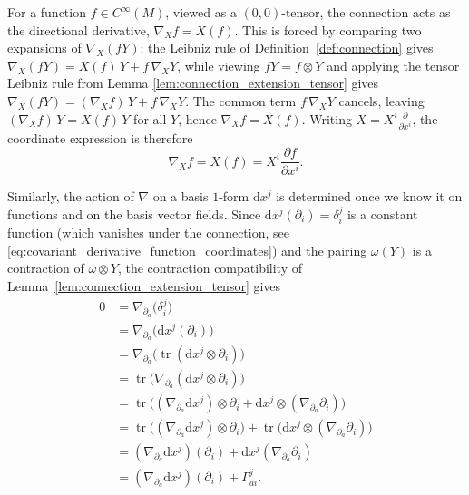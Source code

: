 

For a function $f \in C^\infty(M)$, viewed as a $(0,0)$-tensor, the connection acts as the directional derivative, $\nabla_X f = X(f)$. This is forced by comparing two expansions of $\nabla_X(fY)$: the Leibniz rule of Definition~\ref{def:connection} gives $\nabla_X(fY) = X(f)\,Y + f\,\nabla_X Y$, while viewing $fY = f \otimes Y$ and applying the tensor Leibniz rule from Lemma \ref{lem:connection_extension_tensor} gives $\nabla_X(fY) = (\nabla_X f)\,Y + f\,\nabla_X Y$. The common term $f\,\nabla_X Y$ cancels, leaving $(\nabla_X f)\,Y = X(f)\,Y$ for all $Y$, hence $\nabla_X f = X(f)$. Writing $X = X^i \frac{\partial}{\partial x^i}$, the coordinate expression is therefore
\begin{equation}
    \label{eq:covariant_derivative_function_coordinates}
    \nabla_X f = X(f) = X^i \frac{\partial f}{\partial x^i}.
\end{equation}






Similarly, the action of $\nabla$ on a basis $1$-form $\mathrm{d}x^j$ is determined once we know it on functions and on the basis vector fields. Since $\mathrm{d}x^j(\partial_i) = \delta^j_i$ is a constant function (which vanishes under the connection, see \eqref{eq:covariant_derivative_function_coordinates}) and the pairing $\omega(Y)$ is a contraction of $\omega \otimes Y$, the contraction compatibility of Lemma~\ref{lem:connection_extension_tensor} gives
\begin{align*}
    0
    &= \nabla_{\partial_a}\big(\delta^j_i\big) \\
    &= \nabla_{\partial_a}\big(\mathrm{d}x^j(\partial_i)\big) \\
    &= \nabla_{\partial_a}\big(\operatorname{tr}(\mathrm{d}x^j \otimes \partial_i)\big) \\
    &= \operatorname{tr}\big(\nabla_{\partial_a}(\mathrm{d}x^j \otimes \partial_i)\big) \\
    &= \operatorname{tr}\big((\nabla_{\partial_a}\mathrm{d}x^j) \otimes \partial_i + \mathrm{d}x^j \otimes (\nabla_{\partial_a}\partial_i)\big) \\
    &= \operatorname{tr}\big((\nabla_{\partial_a}\mathrm{d}x^j) \otimes \partial_i\big) + \operatorname{tr}\big(\mathrm{d}x^j \otimes (\nabla_{\partial_a}\partial_i)\big) \\
    &= (\nabla_{\partial_a}\mathrm{d}x^j)(\partial_i) + \mathrm{d}x^j(\nabla_{\partial_a}\partial_i)  \\
    &= (\nabla_{\partial_a}\mathrm{d}x^j)(\partial_i) + \Gamma^j_{ai}.
\end{align*}

